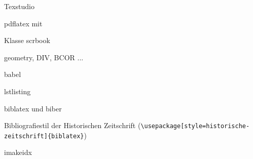




\frontmatter



\tableofcontents
\mainmatter




















\printbibliography




\vfill
{}

Texstudio

pdflatex mit \KOMAScript 

Klasse scrbook

geometry, DIV,  BCOR ...

babel

lstlisting

biblatex und biber

Bibliografiestil der Historischen Zeitschrift (\lstinline/\usepackage[style=historische-zeitschrift]{biblatex}/)

imakeidx

